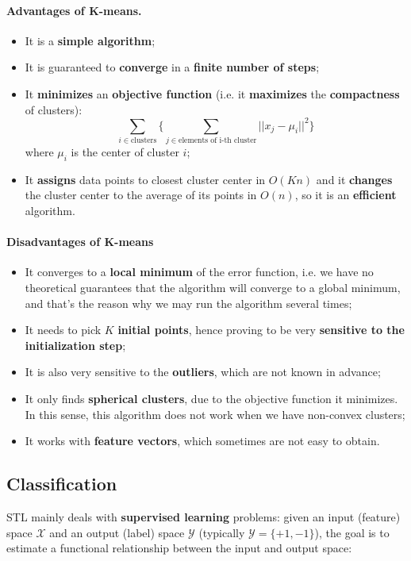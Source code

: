\paragraph*{Advantages of K-means.} 
\begin{itemize}
        \item It is a \textbf{simple algorithm};
	\item It is guaranteed to \textbf{converge} in a \textbf{finite number of steps};
	\item It \textbf{minimizes} an \textbf{objective function} (i.e. it \textbf{maximizes} the \textbf{compactness} of clusters):
	$$\sum_{i \in \text{clusters}} \Biggl\{ \sum_{j \in \text{elements of i-th cluster}} ||x_j - \mu_i||^2 \Biggr\}$$
	where $\mu_i$ is the center of cluster $i$;
	\item It \textbf{assigns} data points to closest cluster center in $O(Kn)$ and it \textbf{changes} the cluster center to the average of its points in $O(n)$, so it is an \textbf{efficient} algorithm.
\end{itemize}

\paragraph{Disadvantages of K-means}

\begin{itemize}
    \item It converges to a \textbf{local minimum} of the error function, i.e. we have no theoretical guarantees that the algorithm will converge to a global minimum, and that's the reason why we may run the algorithm several times;
    \item It needs to pick $K$ \textbf{initial points}, hence proving to be very \textbf{sensitive to the initialization step};
    \item It is also very sensitive to the \textbf{outliers}, which are not known in advance;
    \item It only finds \textbf{spherical clusters}, due to the objective function it minimizes. In this sense, this algorithm does not work when we have non-convex clusters;
    \item It works with \textbf{feature vectors}, which sometimes are not easy to obtain.
\end{itemize}

\subsection{Classification}
STL mainly deals with \textbf{supervised learning} problems: given an input (feature) space $\mathcal{X}$ and an output (label) space $\mathcal{Y}$ (typically $\mathcal{Y} = \{ +1, -1 \}$), the goal is to estimate a functional relationship between the input and output space:


